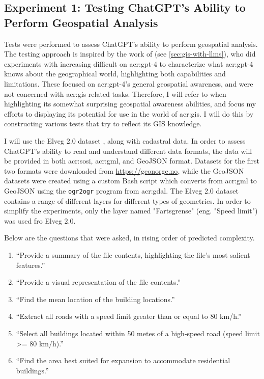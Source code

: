 \subsection{Experiment 1: Testing ChatGPT's Ability to Perform Geospatial Analysis}

Tests were performed to assess ChatGPT's ability to perform geospatial analysis. The testing approach is inspired by the work of \cite{robertsGPT4GEOHowLanguage2023} (see \autoref{sec:gis-with-llms}), who did experiments with increasing difficult on \acrshort{acr:gpt}-4 to characterize what \acrshort{acr:gpt}-4 knows about the geographical world, highlighting both capabilities and limitations. These focused on \acrshort{acr:gpt}-4's general geospatial awareness, and were not concerned with \acrshort{acr:gis}-related tasks. Therefore, I will refer to \cite{robertsGPT4GEOHowLanguage2023} when highlighting its somewhat surprising geospatial awareness abilities, and focus my efforts to displaying its potential for use in the world of \acrshort{acr:gis}. I will do this by constructing various tests that try to reflect its GIS knowledge.

I will use the Elveg 2.0 dataset \citep{thenorwegianmappingauthorityElveg2019}, along with cadastral data. In order to assess ChatGPT's ability to read and understand different data formats, the data will be provided in both \acrshort{acr:sosi}, \acrshort{acr:gml}, and GeoJSON format. Datasets for the first two formats were downloaded from \url{https://geonorge.no}, while the GeoJSON datasets were created using a custom Bash script which converts from \acrshort{acr:gml} to GeoJSON using the \texttt{ogr2ogr} program from \acrshort{acr:gdal}. The Elveg 2.0 dataset contains a range of different layers for different types of geometries. In order to simplify the experiments, only the layer named "Fartsgrense" (eng. "Speed limit") was used fro Elveg 2.0.

Below are the questions that were asked, in rising order of predicted complexity.

\begin{enumerate}
    \item \enquote{Provide a summary of the file contents, highlighting the file's most salient features.}
    \item \enquote{Provide a visual representation of the file contents.}
    \item \enquote{Find the mean location of the building locations.}
    \item \enquote{Extract all roads with a speed limit greater than or equal to 80 km/h.}
    \item \enquote{Select all buildings located within 50 metes of a high-speed road (speed limit >= 80 km/h).}
    \item \enquote{Find the area best suited for expansion to accommodate residential buildings.}
\end{enumerate}
\label{enum:gpt-gis-questions}

